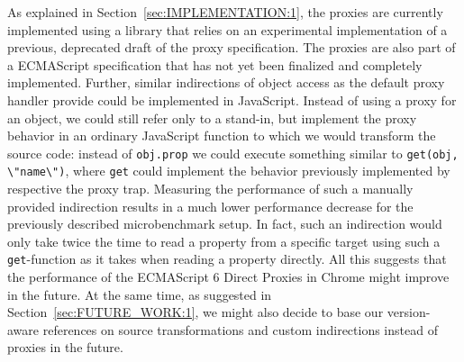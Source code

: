 
As explained in Section~\ref{sec:IMPLEMENTATION:1}, the proxies are currently implemented using a library that relies on an experimental implementation of a previous, deprecated draft of the proxy specification.
The proxies are also part of a ECMAScript specification that has not yet been finalized and completely implemented.
Further, similar indirections of object access as the default proxy handler provide could be implemented in JavaScript.
Instead of using a proxy for an object, we could still refer only to a stand-in, but implement the proxy behavior in an ordinary JavaScript function to which we would transform the source code: instead of \lstinline{obj.prop} we could execute something similar to \lstinline{get(obj, \"name\")}, where \lstinline{get} could implement the behavior previously implemented by respective the proxy trap.
Measuring the performance of such a manually provided indirection results in a much lower performance decrease for the previously described microbenchmark setup.
In fact, such an indirection would only take twice the time to read a property from a specific target using such a \lstinline{get}-function as it takes when reading a property directly. 
All this suggests that the performance of the ECMAScript 6 Direct Proxies in Chrome might improve in the future.
At the same time, as suggested in Section~\ref{sec:FUTURE_WORK:1}, we might also decide to base our version-aware references on source transformations and custom indirections instead of proxies in the future.

